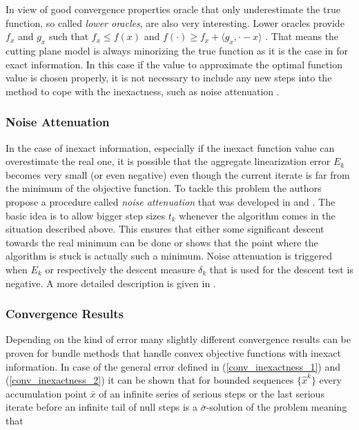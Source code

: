 In view of good convergence properties oracle that only underestimate the true function, so called \emph{lower oracles}, are also very interesting.
Lower oracles provide \(f_x\) and \(g_x\) such that \(f_x \leq f(x) \) and \(f(\cdot) \geq f_x + \langle g_x, \cdot - x\rangle\) . That means the cutting plane model is always minorizing the true function as it is the case in for exact information.
In this case if the value to approximate the optimal function value is chosen properly, it is not necessary to include any new steps into the method to cope with the inexactness, such as noise attenuation \cite[Corollary 5.2]{Oliveira2014}.

\subsubsection{Noise Attenuation}

In the case of inexact information, especially if the inexact function value can overestimate the real one, it is possible that the aggregate linearization error \(E_k\) becomes very small (or even negative) even though the current iterate is far from the minimum of the objective function.
To tackle this problem the authors propose a procedure called \emph{noise attenuation} that was developed in \cite{Hintermueller2001} and \cite{Kiwiel2006}.
The basic idea is to allow bigger step sizes \(t_k\) whenever the algorithm comes in the situation described above. This ensures that either some significant descent towards the real minimum can be done or shows that the point where the algorithm is stuck is actually such a minimum.
Noise attenuation is triggered when \(E_k\) or respectively the descent measure \(\delta_k\) that is used for the descent test is negative. A more detailed description is given in \cite{Oliveira2014}.

\subsubsection{Convergence Results}
Depending on the kind of error many slightly different convergence results can be proven for bundle methods that handle convex objective functions with inexact information.
In case of the general error defined in (\ref{conv_inexactness_1})  and (\ref{conv_inexactness_2}) it can be shown that for bounded sequences \(\{\hat{x}^k\}\) every accumulation point \(\bar{x}\) of an infinite series of serious steps or the last serious iterate before an infinite tail of null steps is a \(\bar{\sigma}\)-solution of the problem meaning that 

